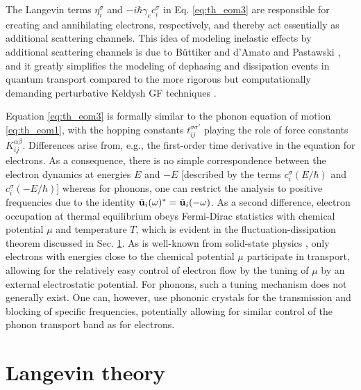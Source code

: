 The Langevin terms $\eta_i^{\sigma}$ and $-i\hbar \gamma_e c_i^{\sigma}$ in Eq. \eqref{eq:th_eom3} are responsible for creating and annihilating electrons, respectively, and thereby act essentially as additional scattering channels. This idea of modeling inelastic effects by additional scattering channels is due to B\"uttiker \cite{buttiker86} and d'Amato and Pastawski \cite{damato90}, and it greatly simplifies the modeling of dephasing and dissipation events in quantum transport compared to the more rigorous but computationally demanding perturbative Keldysh GF techniques \cite{haugjauho}.

Equation \eqref{eq:th_eom3} is formally similar to the phonon equation of motion \eqref{eq:th_eom1}, with the hopping constants $t_{ij}^{\sigma\sigma'}$ playing the role of force constants $K_{ij}^{\alpha\beta}$. Differences arise from, e.g., the first-order time derivative in the equation for electrons. As a consequence, there is no simple correspondence between the electron dynamics at energies $E$ and $-E$ [described by the terms $c_i^{\sigma}(E/\hbar)$ and $c_i^{\sigma}(-E/\hbar)$] whereas for phonons, one can restrict the analysis to positive frequencies due to the identity $\tilde{\mathbf{u}}_i(\omega)^*=\tilde{\mathbf{u}}_i(-\omega)$. As a second difference, electron occupation at thermal equilibrium obeys Fermi-Dirac statistics with chemical potential $\mu$ and temperature $T$, which is evident in the fluctuation-dissipation theorem discussed in Sec. \ref{sec:th_langevin}. As is well-known from solid-state physics \cite{ashcroftmermin}, only electrons with energies close to the chemical potential $\mu$ participate in transport, allowing for the relatively easy control of electron flow by the tuning of $\mu$ by an external electrostatic potential. For phonons, such a tuning mechanism does not generally exist. One can, however, use phononic crystals \cite{maldovan13} for the transmission and blocking of specific frequencies, potentially allowing for similar control of the phonon transport band as for electrons.  



\section{Langevin theory}
\label{sec:th_langevin}

